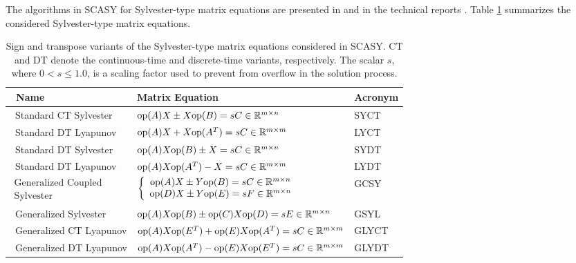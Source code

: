 \documentclass[11pt]{article}
\newcommand{\R}{{\mathbb R}}
\begin{document}
The algorithms in SCASY for Sylvester-type matrix equations are
presented in \cite{granatkagstrom09a,granatkagstrom09b} and in the
technical reports \cite{granatkagstrom07a,granatkagstrom07b}.
Table \ref{tab:matrixequations} summarizes the considered
Sylvester-type matrix equations.

\begin{table}[!htb]
\centering \small
\begin{tabular}{|l|l|l|} \hline
~Name & Matrix Equation & Acronym \\ \hline
~Standard CT Sylvester& ${\rm op}(A)X \pm X{\rm op}(B)   = sC \in \R^{m\times n}$ & SYCT \\
~Standard DT Lyapunov   & ${\rm op}(A)X  +  X{\rm op}(A^T) = sC \in \R^{m\times m}$ & LYCT \\
~Standard DT Sylvester & ${\rm op}(A)X{\rm op}(B) \pm X   = sC \in \R^{m\times n}$ & SYDT \\
~Standard DT Lyapunov  & ${\rm op}(A)X{\rm op}(A^T) - X   =sC \in \R^{m\times m}$ & LYDT \\
$\begin{array}{l}\mbox{Generalized Coupled} \\ \mbox{Sylvester}
\end{array}$
 &
    $ \left\{ \begin{array}{c}
    {\rm op}(A)X \pm Y {\rm op}(B) = sC \in \R^{m\times n} \\
    {\rm op}(D)X \pm Y {\rm op}(E) = sF \in \R^{m\times n} \\
    \end{array} \right. $ & GCSY \\
~Generalized Sylvester   & ${\rm op}(A)X{\rm op}(B) \pm {\rm
op}(C)X{\rm op}(D)=sE \in \R^{m\times n}$
& GSYL \\
~Generalized CT Lyapunov & ${\rm op}(A)X{\rm op}(E^T)+{\rm
op}(E)X{\rm op}(A^T)=sC \in \R^{m\times m}$
& GLYCT \\
~Generalized DT Lyapunov & ${\rm op}(A)X{\rm op}(A^T)-{\rm
op}(E)X{\rm op}(E^T)=sC \in \R^{m\times m}$
& GLYDT \\
\hline
\end{tabular}
\caption{Sign and transpose variants of the Sylvester-type matrix
equations considered in SCASY. CT and DT denote the
continuous-time and discrete-time variants, respectively. The
scalar $s$, where $0 < s \leq 1.0$, is a scaling factor used to
prevent from overflow in the solution process.}
\label{tab:matrixequations}
\end{table}
\end{document}
